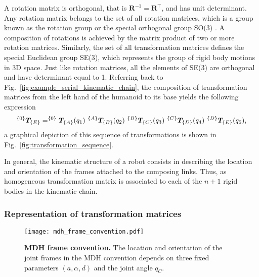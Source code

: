 A rotation matrix is orthogonal, that is $ \bm{R}^{-1} = \bm{R}^\intercal$, and has unit determinant. Any rotation matrix belongs to the set of all rotation matrices, which is a group known as the rotation group or the special orthogonal group SO(3) \cite{Lynch2017Modernrobotics}. A composition of rotations is achieved by the matrix product of two or more rotation matrices. Similarly, the set of all transformation matrices defines the special Euclidean group SE(3), which represents the group of rigid body motions in 3D space. Just like rotation matrices, all the elements of SE(3) are orthogonal and have determinant equal to 1. Referring back to Fig.~\ref{fig:example_serial_kinematic_chain}, the composition of transformation matrices from the left hand of the humanoid to its base yields the following expression
\begin{equation}
	^{\left\lbrace 0 \right\rbrace}\bm{T}_{\left\lbrace E \right\rbrace} = 
	^{\left\lbrace 0 \right\rbrace}\bm{T}_{\left\lbrace A \right\rbrace}(q_1)~
	^{\left\lbrace A \right\rbrace}\bm{T}_{\left\lbrace B \right\rbrace}(q_2)~
	^{\left\lbrace B \right\rbrace}\bm{T}_{\left\lbrace C \right\rbrace}(q_3)~
	^{\left\lbrace C \right\rbrace}\bm{T}_{\left\lbrace D \right\rbrace}(q_4)~
	^{\left\lbrace D \right\rbrace}\bm{T}_{\left\lbrace E \right\rbrace}(q_5),
\end{equation}
a graphical depiction of this sequence of transformations is shown in Fig.~\ref{fig:transformation_sequence}.

In general, the kinematic structure of a robot consists in describing the location and orientation of the frames attached to the composing links. Thus, as homogeneous transformation matrix is associated to each of the $n+1$ rigid bodies in the kinematic chain.

\subsubsection{Representation of transformation matrices}
\begin{figure}
	\begin{center}
		\texttt{[image: mdh\_frame\_convention.pdf]}
		\caption{\textbf{MDH frame convention.} The location and orientation of the joint frames in the MDH convention depends on three fixed parameters $(a,\alpha,d)$ and the joint angle $q_C$.}
		\label{fig:mdh_frame_convention}
	\end{center}
\end{figure}
